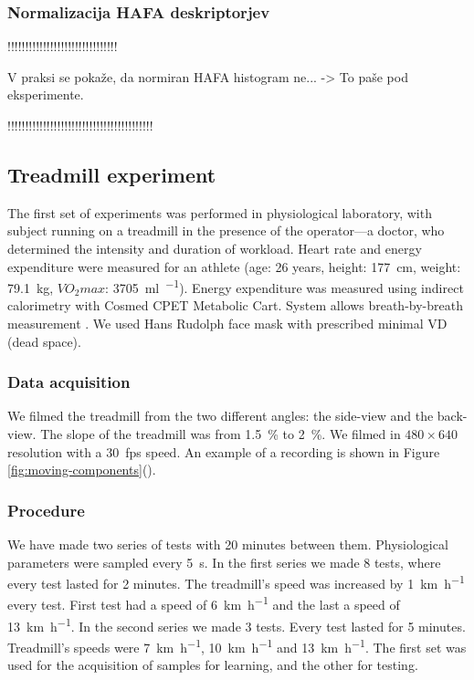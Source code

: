 \subsubsection{Normalizacija HAFA deskriptorjev}
!!!!!!!!!!!!!!!!!!!!!!!!!!!!!!!

V praksi se pokaže, da normiran HAFA histogram ne... -> To paše pod eksperimente.

!!!!!!!!!!!!!!!!!!!!!!!!!!!!!!!!!!!!!!!!!


\subsection{Treadmill experiment}
The first set of experiments was performed in physiological laboratory, with subject running on a treadmill in the presence of the operator---a doctor, who determined the intensity and duration of workload. Heart rate and energy expenditure were measured for an athlete (age: 26 years, height: \SI{177}{\cm}, weight: \SI{79.1}{\kg}, $VO_2max$: \SI{3705}{\ml\per\min}). Energy expenditure was measured using indirect calorimetry with Cosmed CPET Metabolic Cart. System allows breath-by-breath measurement \cite{beaver1973line}. We used Hans Rudolph face mask with prescribed minimal VD (dead space).

\subsubsection{Data acquisition}
We filmed the treadmill from the two different angles: the side-view and the back-view. The slope of the treadmill was from \SI{1.5}{\%} to \SI{2}{\%}. We filmed in $480 \times 640$ resolution with a \SI{30}{fps} speed. An example of a recording is shown in Figure \ref{fig:moving-components}().

\subsubsection{Procedure}
We have made two series of tests with 20 minutes between them. Physiological parameters were sampled every \SI{5}{\s}. In the first series we made 8 tests, where every test lasted for 2 minutes. The treadmill's speed was increased by \SI{1}{\km\per\hour} every test. First test had a speed of \SI{6}{\km\per\hour} and the last a speed of \SI{13}{\km\per\hour}. In the second series we made 3 tests. Every test lasted for 5 minutes. Treadmill's speeds were \SI{7}{\km\per\hour}, \SI{10}{\km\per\hour} and \SI{13}{\km\per\hour}. The first set was used for the acquisition of samples for learning, and the other for testing.


